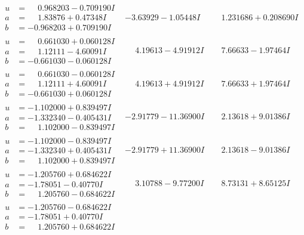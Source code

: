 \documentclass[1p]{elsarticle_modified}
\theoremstyle{definition}
\begin{document}
$$\begin{array}{c|c|c}
\begin{aligned}
u &= \phantom{-}0.968203 - 0.709190 I \\
a &= \phantom{-}1.83876 + 0.47348 I \\
b &= -0.968203 + 0.709190 I\end{aligned}
 & -3.63929 - 1.05448 I & \phantom{-}1.231686 + 0.208690 I \\ \hline\begin{aligned}
u &= \phantom{-}0.661030 + 0.060128 I \\
a &= \phantom{-}1.12111 - 4.60091 I \\
b &= -0.661030 - 0.060128 I\end{aligned}
 & \phantom{-}4.19613 - 4.91912 I & \phantom{-}7.66633 - 1.97464 I \\ \hline\begin{aligned}
u &= \phantom{-}0.661030 - 0.060128 I \\
a &= \phantom{-}1.12111 + 4.60091 I \\
b &= -0.661030 + 0.060128 I\end{aligned}
 & \phantom{-}4.19613 + 4.91912 I & \phantom{-}7.66633 + 1.97464 I \\ \hline\begin{aligned}
u &= -1.102000 + 0.839497 I \\
a &= -1.332340 - 0.405431 I \\
b &= \phantom{-}1.102000 - 0.839497 I\end{aligned}
 & -2.91779 - 11.36900 I & \phantom{-}2.13618 + 9.01386 I \\ \hline\begin{aligned}
u &= -1.102000 - 0.839497 I \\
a &= -1.332340 + 0.405431 I \\
b &= \phantom{-}1.102000 + 0.839497 I\end{aligned}
 & -2.91779 + 11.36900 I & \phantom{-}2.13618 - 9.01386 I \\ \hline\begin{aligned}
u &= -1.205760 + 0.684622 I \\
a &= -1.78051 - 0.40770 I \\
b &= \phantom{-}1.205760 - 0.684622 I\end{aligned}
 & \phantom{-}3.10788 - 9.77200 I & \phantom{-}8.73131 + 8.65125 I \\ \hline\begin{aligned}
u &= -1.205760 - 0.684622 I \\
a &= -1.78051 + 0.40770 I \\
b &= \phantom{-}1.205760 + 0.684622 I\end{aligned}

\end{array}$$
\end{document}
